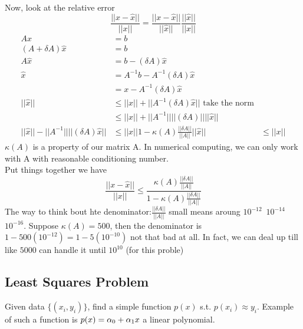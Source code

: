 Now, look at the relative error $$\frac{||x-\hat
  x||}{||x||}=\frac{||x-\hat x||}{||\hat x||}\frac{||\hat
  x||}{||x||}$$
\begin{align*}
Ax&=b \\
(A+\delta A)\hat x &= b\\
A\hat x&= b-(\delta A)\hat x\\
\hat x &= A^{-1}b - A^{-1}(\delta A)\hat x\\
&= x -  A^{-1}(\delta A)\hat x\\
||\hat x|| &\le ||x|| + ||A^{-1}(\delta A)\hat x|| \text{ take the
  norm}\\ 
&\le  ||x|| + ||A^{-1}|| ||(\delta A)||||\hat x|| \\
||\hat x|| - ||A^{-1}|| ||(\delta A)\hat x|| &\le ||x ||
1-\kappa(A)\frac{||\delta A||}{||A||}||\hat x|| &\le ||x||
\end{align*}
$\kappa(A)$ is a property of our matrix A. In numerical computing, we
can only work with A with reasonable conditioning number.\\
Put things together we have
$$\frac{||x-\hat
  x||}{||x||} \le \frac{ \kappa(A)\frac{||\delta A||}{||A||}}{1-\kappa(A)\frac{||\delta A||}{||A||}}$$
The way to think bout hte denominator:$\frac{||\delta A||}{||A||}$
small means aroung $10^{-12}$~$10^{-14}$~$10^{-16}$. Suppose
$\kappa(A)=500$, then the denominator is
$1-500(10^{-12})=1-5(10^{-10})$ not that bad at all. In fact, we can
deal up till like $5000$ can handle it until $10^{10}$ (for this
proble)

\subsection{Least Squares Problem}
\label{sec:leastsquares}

Given data $\{(x_i,y_i)\}$, find a simple function $p(x)$
s.t. $p(x_i)\approx y_i$. Example of such a function is
$p(x)=\alpha_0+\alpha_1x$ a linear polynomial. 

